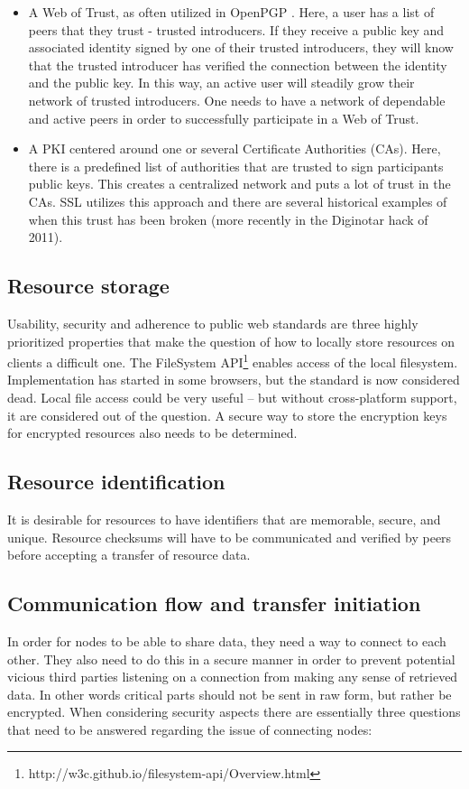 \begin{itemize}
  \item A Web of Trust, as often utilized in OpenPGP \cite{Maurer:1996}. Here, a user has a list of peers that they trust - trusted introducers. If they receive a public key and associated identity signed by one of their trusted introducers, they will know that the trusted introducer has verified the connection between the identity and the public key. In this way, an active user will steadily grow their network of trusted introducers. One needs to have a network of dependable and active peers in order to successfully participate in a Web of Trust.

\item A PKI centered around one or several Certificate Authorities (CAs). Here, there is a predefined list of authorities that are trusted to sign participants public keys. This creates a centralized network and puts a lot of trust in the CAs. SSL utilizes this approach and there are several historical examples of when this trust has been broken (more recently in the Diginotar hack of 2011).
\end{itemize}

\subsection{Resource storage}
Usability, security and adherence to public web standards are three highly prioritized properties that make the question of how to locally store resources on clients a difficult one. The FileSystem API\footnote{http://w3c.github.io/filesystem-api/Overview.html} enables access of the local filesystem. Implementation has started in some browsers, but the standard is now considered dead\cite{W3C:2014}. Local file access could be very useful – but without cross-platform support, it are considered out of the question. A secure way to store the encryption keys for encrypted resources also needs to be determined.

\subsection{Resource identification}
It is desirable for resources to have identifiers that are memorable, secure, and unique. Resource checksums will have to be communicated and verified by peers before accepting a transfer of resource data.

\subsection{Communication flow and transfer initiation}
In order for nodes to be able to share data, they need a way to connect to each other. They also need to do this in a secure manner in order to prevent potential vicious third parties listening on a connection from making any sense of retrieved data. In other words critical parts should not be sent in raw form, but rather be encrypted. When considering security aspects there are essentially three questions that need to be answered regarding the issue of connecting nodes:

